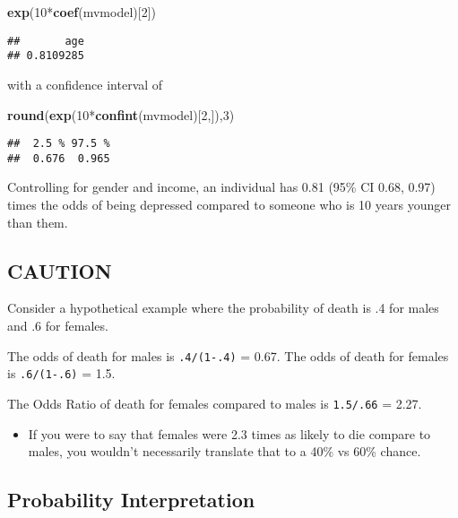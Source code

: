 \documentclass[]{article}
\newenvironment{Shaded}{\begin{snugshade}}{\end{snugshade}}
\newcommand{\KeywordTok}[1]{\textcolor[rgb]{0.13,0.29,0.53}{\textbf{{#1}}}}
\newcommand{\DecValTok}[1]{\textcolor[rgb]{0.00,0.00,0.81}{{#1}}}
\newcommand{\NormalTok}[1]{{#1}}
\begin{document}
\begin{Shaded}
\begin{Highlighting}[]
\KeywordTok{exp}\NormalTok{(}\DecValTok{10}\NormalTok{*}\KeywordTok{coef}\NormalTok{(mvmodel)[}\DecValTok{2}\NormalTok{])}
\end{Highlighting}
\end{Shaded}

\begin{verbatim}
##       age 
## 0.8109285
\end{verbatim}

with a confidence interval of

\begin{Shaded}
\begin{Highlighting}[]
\KeywordTok{round}\NormalTok{(}\KeywordTok{exp}\NormalTok{(}\DecValTok{10}\NormalTok{*}\KeywordTok{confint}\NormalTok{(mvmodel)[}\DecValTok{2}\NormalTok{,]),}\DecValTok{3}\NormalTok{)}
\end{Highlighting}
\end{Shaded}

\begin{verbatim}
##  2.5 % 97.5 % 
##  0.676  0.965
\end{verbatim}

Controlling for gender and income, an individual has 0.81 (95\% CI 0.68,
0.97) times the odds of being depressed compared to someone who is 10
years younger than them.

\subsection{CAUTION}\label{caution}

Consider a hypothetical example where the probability of death is .4 for
males and .6 for females.

The odds of death for males is \texttt{.4/(1-.4)} = 0.67. The odds of
death for females is \texttt{.6/(1-.6)} = 1.5.

The Odds Ratio of death for females compared to males is
\texttt{1.5/.66} = 2.27.

\begin{itemize}
\itemsep1pt\parskip0pt
\item
  If you were to say that females were 2.3 times as likely to die
  compare to males, you wouldn't necessarily translate that to a 40\% vs
  60\% chance.
\end{itemize}

\subsection{Probability
Interpretation}\label{probability-interpretation}
\end{document}
